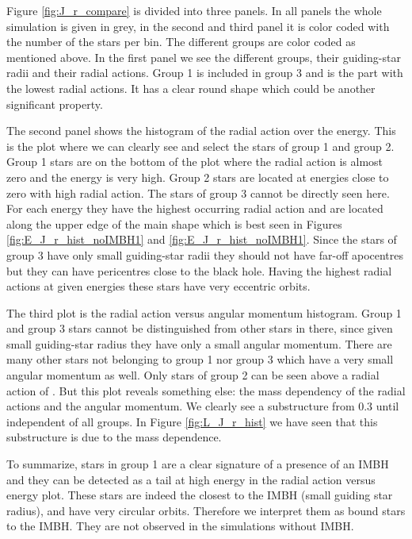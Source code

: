 \par 
Figure \ref{fig:J_r_compare} is divided into three panels. In all panels the whole simulation is given in grey, in the second and third panel it is color coded with the number of the stars per bin. The different groups are color coded as mentioned above. In the first panel we see the different groups, their guiding-star radii and their radial actions. Group 1 is included in group 3 and is the part with the lowest radial actions. It has a clear round shape which could be another significant property. 
\par The second panel shows the histogram of the radial action over the energy. This is the plot where we can clearly see and select the stars of group 1 and group 2. Group 1 stars are on the bottom of the plot where the radial action is almost zero and the energy is very high. Group 2 stars are located at energies close to zero with high radial action. The stars of group 3 cannot be directly seen here. For each energy they have the highest occurring radial action and are located along the upper edge of the main shape which is best seen in Figures \ref{fig:E_J_r_hist_noIMBH1} and \ref{fig:E_J_r_hist_noIMBH1}. Since the stars of group 3 have only  small guiding-star radii they should not have far-off apocentres but they can have pericentres close to the black hole. Having the highest radial actions at given energies these stars have very eccentric orbits. 
\par The third plot is the radial action versus angular momentum histogram. Group 1 and group 3 stars cannot be distinguished from other stars in there, since given small guiding-star radius they have only a small angular momentum. There are many other stars not belonging to group 1 nor group 3 which have a very small angular momentum as well. Only stars of group 2 can be seen above a radial action of . But this plot reveals something else: the mass dependency of the radial actions and the angular momentum. We clearly see a substructure from 0.3 until  independent of all groups. In Figure \ref{fig:L_J_r_hist} we have seen that this substructure is due to the mass dependence. 
\par To summarize, stars in group 1 are a clear signature of a presence of an \ac{IMBH} and they can be detected as a tail at high energy in the radial action versus energy plot. These stars are indeed the closest to the \ac{IMBH} (small guiding star radius), and have very circular orbits. Therefore we interpret them as bound stars to the \ac{IMBH}. They are not observed in the simulations without \ac{IMBH}.



